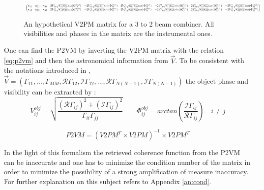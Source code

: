 \begin{figure}[h]
\begin{equation*}
\resizebox{\textwidth}{!}{
 $ \begin{pmatrix}
  \kappa_{11} & \kappa_{21} & \kappa_{31} &
  2V_{12}^{1}\sqrt{\kappa_{11}\kappa_{21}}cos(\Phi_{12}^{inst}) &
  -2V_{12}^{1}\sqrt{\kappa_{11}\kappa_{21}}sin(\Phi_{12}^{inst}) &
  2V_{13}^{1}\sqrt{\kappa_{11}\kappa_{31}}cos(\Phi_{13}^{inst}) &
 - 2V_{13}^{1}\sqrt{\kappa_{11}\kappa_{31}}sin(\Phi_{13}^{inst}) &
  2V_{23}^{1}\sqrt{\kappa_{21}\kappa_{31}}cos(\Phi_{23}^{inst}) & -2V_{23}^{1}\sqrt{\kappa_{21}\kappa_{31}}sin(\Phi_{23}^{inst})\\
  \kappa_{12} & \kappa_{22} & \kappa_{32} &
  2V_{12}^{2}\sqrt{\kappa_{12}\kappa_{22}}cos(\Phi_{12}^{inst}) &
  -2V_{12}^{2}\sqrt{\kappa_{12}\kappa_{22}}sin(\Phi_{12}^{inst}) &
  2V_{13}^{2}\sqrt{\kappa_{12}\kappa_{32}}cos(\Phi_{13}^{inst}) &
 - 2V_{13}^{2}\sqrt{\kappa_{12}\kappa_{32}}sin(\Phi_{13}^{inst}) &
  2V_{23}^{2}\sqrt{\kappa_{22}\kappa_{32}}cos(\Phi_{23}^{inst}) &   -2V_{23}^{2}\sqrt{\kappa_{22}\kappa_{32}}sin(\Phi_{23}^{inst})

\end{pmatrix}
$}
\end{equation*}
\caption{An hypothetical V2PM matrix for a 3 to 2 beam combiner. All visibilities and phases in the matrix are the instrumental ones.}
\label{v2pm.expl}
\end{figure}

One can find the \gls{P2VM} by inverting the V2PM
matrix with the relation \ref{eq:p2vm} and then the astronomical
information from $\vec{V}$. To be consistent with the notations introduced in \cite{saviauk},   $\vec{V} =
(\Gamma_{11},...,\Gamma_{MM},\mathcal{R}\Gamma_{12},\mathcal{I}\Gamma_{12},...,\mathcal{R}\Gamma_{N(N-1)},\mathcal{I}\Gamma_{N(N-1)})$ the object phase and visibility can be extracted by :
\begin{equation}\label{eq:banana}
V_{ij}^{obj} = \sqrt{\frac{(\mathcal{R}\Gamma_{ij})^2+(\mathcal{I}\Gamma_{ij})^2}{\Gamma_{ii}\Gamma_{jj}}} \qquad
\Phi_{ij}^{obj} = arctan(\frac{\mathcal{I}\Gamma_{ij}}{\mathcal{R}\Gamma_{ij}}) \quad i\neq j
\end{equation}

\begin{equation}
  P2VM = (V2PM^T\times V2PM)^{-1}\times V2PM^{T} \label{eq:p2vm}
\end{equation}  

In the light of this formalism the retrieved coherence function from the \gls{P2VM} can be inaccurate and one has to minimize the condition number of the matrix in order to minimize the possibility of a strong amplification of measure inaccuracy. For further explanation on this subject refers to Appendix \ref{an:cond}.

